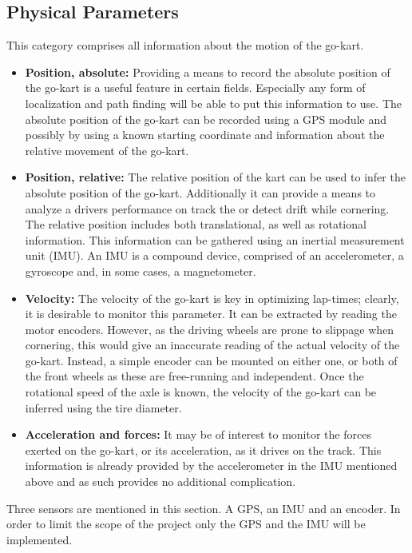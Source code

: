 \subsection{Physical Parameters}
This category comprises all information about the motion of the go-kart.
\begin{itemize}
	\item \textbf{Position, absolute:} Providing a means to record the absolute position of the go-kart is a useful feature in certain fields.
	Especially any form of localization and path finding will be able to put this information to use.
	The absolute position of the go-kart can be recorded using a GPS module and possibly by using a known starting coordinate and information about the relative movement of the go-kart.
	\item \textbf{Position, relative:} The relative position of the kart can be used to infer the absolute position of the go-kart.
	Additionally it can provide a means to analyze a drivers performance on track the or detect drift while cornering.
	The relative position includes both translational, as well as rotational information.
	This information can be gathered using an inertial measurement unit (IMU).
	An IMU is a compound device, comprised of an accelerometer, a gyroscope and, in some cases, a magnetometer.
	\item \textbf{Velocity:} The velocity of the go-kart is key in optimizing lap-times; clearly, it is desirable to monitor this parameter.
	It can be extracted by reading the motor encoders.
	However, as the driving wheels are prone to slippage when cornering, this would give an inaccurate reading of the actual velocity of the go-kart.
	Instead, a simple encoder can be mounted on either one, or both of the front wheels as these are free-running and independent.
	Once the rotational speed of the axle is known, the velocity of the go-kart can be inferred using the tire diameter.
	\item \textbf{Acceleration and forces:} It may be of interest to monitor the forces exerted on the go-kart, or its acceleration, as it drives on the track.
	This information is already provided by the accelerometer in the IMU mentioned above and as such provides no additional complication.
\end{itemize}
Three sensors are mentioned in this section.
A GPS, an IMU and an encoder.
In order to limit the scope of the project only the GPS and the IMU will be implemented.
